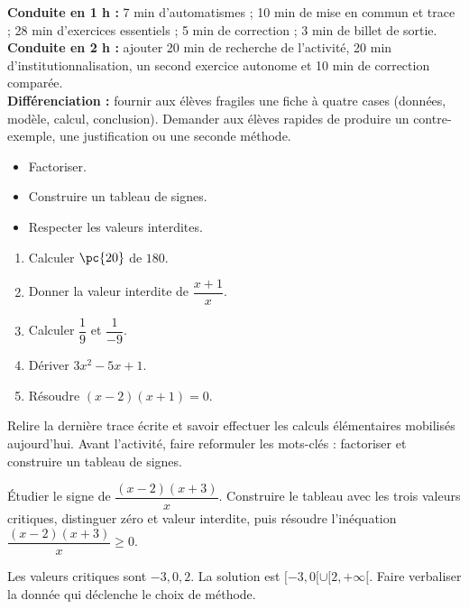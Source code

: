 \ifmxteacher
\begin{method}
\textbf{Conduite en 1 h :} 7 min d'automatismes ; 10 min de mise en commun et trace ; 28 min d'exercices essentiels ; 5 min de correction ; 3 min de billet de sortie.\\
\textbf{Conduite en 2 h :} ajouter 20 min de recherche de l'activité, 20 min d'institutionnalisation, un second exercice autonome et 10 min de correction comparée.\\
\textbf{Différenciation :} fournir aux élèves fragiles une fiche à quatre cases (données, modèle, calcul, conclusion). Demander aux élèves rapides de produire un contre-exemple, une justification ou une seconde méthode.
\end{method}
\fi
{}
\begin{objectives}\begin{itemize}\item Factoriser.\item Construire un tableau de signes.\item Respecter les valeurs interdites.\end{itemize}\end{objectives}
\begin{fluency}\begin{enumerate}\item Calculer $\pc{20}$ de $180$. \item Donner la valeur interdite de $\dfrac{x+1}{x}$. \item Calculer $\dfrac1{9}$ et $\dfrac1{-9}$. \item Dériver $3x^2-5x+1$. \item Résoudre $(x-2)(x+1)=0$. \end{enumerate}\end{fluency}
\begin{prerequisites}Relire la dernière trace écrite et savoir effectuer les calculs élémentaires mobilisés aujourd'hui. Avant l'activité, faire reformuler les mots-clés : factoriser et construire un tableau de signes.\end{prerequisites}

\begin{activity}
Étudier le signe de $\dfrac{(x-2)(x+3)}x$. Construire le tableau avec les trois valeurs critiques, distinguer zéro et valeur interdite, puis résoudre l'inéquation $\dfrac{(x-2)(x+3)}x\geq0$.

\end{activity}
\begin{solution}Les valeurs critiques sont $-3,0,2$. La solution est $[-3,0[\cup[2,+\infty[$. Faire verbaliser la donnée qui déclenche le choix de méthode.\end{solution}

